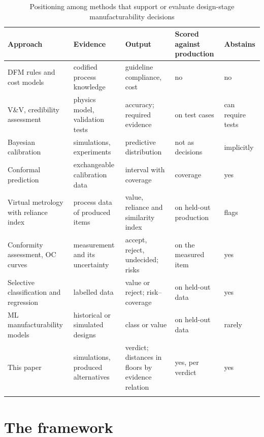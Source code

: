 \documentclass[pdflatex,sn-basic,lineno]{sn-jnl}
\newcommand{\tabsize}{\fontsize{8}{9.5}\selectfont}
\begin{document}
\begin{table}[t]
\tabsize
\setlength{\tabcolsep}{3.5pt}
\caption{Positioning among methods that support or evaluate design-stage manufacturability decisions}\label{tab:positioning}
\begin{tabular}{@{}L{3.2cm}L{2.5cm}L{2.9cm}L{1.9cm}L{1.5cm}@{}}
\toprule
Approach & Evidence & Output & Scored against production & Abstains \\
\midrule
DFM rules and cost models \citep{boothroyd2010product} & codified process knowledge & guideline compliance, cost & no & no \\
V\&V, credibility assessment \citep{oberkampf2010verification, asme2018assessing} & physics model, validation tests & accuracy; required evidence & on test cases & can require tests \\
Bayesian calibration \citep{kennedy2001bayesian} & simulations, experiments & predictive distribution & not as decisions & implicitly \\
Conformal prediction \citep{lei2018distribution} & exchangeable calibration data & interval with coverage & coverage & yes \\
Virtual metrology with reliance index \citep{cheng2008evaluating} & process data of produced items & value, reliance and similarity index & on held-out production & flags \\
Conformity assessment, OC curves \citep{iso2017decision, bechhofer1954single} & measurement and its uncertainty & accept, reject, undecided; risks & on the measured item & yes \\
Selective classification and regression \citep{chow1970optimum, zaoui2020regression} & labelled data & value or reject; risk--coverage & on held-out data & yes \\
ML manufacturability models \citep{ghadai2018learning, yan2026machine} & historical or simulated designs & class or value & on held-out data & rarely \\
This paper & simulations, produced alternatives & verdict; distances in floors by evidence relation & yes, per verdict & yes \\
\botrule
\end{tabular}
\end{table}

\section{The framework}\label{sec:method}
\end{document}
